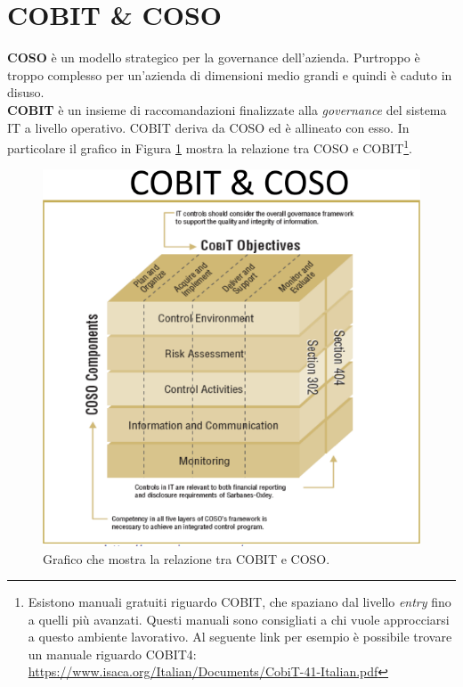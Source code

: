 \section{COBIT \& COSO}

\textbf{COSO} è un modello strategico per la governance dell'azienda. Purtroppo 
è troppo complesso per un'azienda di dimensioni medio grandi e quindi è caduto 
in disuso.\\
\newline
\textbf{COBIT} è un insieme di raccomandazioni finalizzate alla \textit{governance} 
del sistema IT a livello operativo.
COBIT deriva da COSO ed è allineato con esso. In particolare il grafico in Figura
\ref{fig:cobit:coso:relazione} mostra la relazione tra COSO e COBIT\footnote{Esistono manuali gratuiti 
riguardo COBIT, che spaziano dal livello \textit{entry} fino a quelli più 
avanzati. Questi manuali sono consigliati a chi vuole approcciarsi a questo ambiente 
lavorativo. Al seguente link per esempio è possibile trovare un manuale riguardo 
COBIT4:  \url{https://www.isaca.org/Italian/Documents/CobiT-41-Italian.pdf}}.
\begin{figure}[h!]
        \begin{center}
                \includegraphics[scale=2.0]{res/img/cobit_coso_cube}
        \end{center}
        \caption{Grafico che mostra la relazione tra COBIT e COSO.}
        \label{fig:cobit:coso:relazione}
\end{figure}

